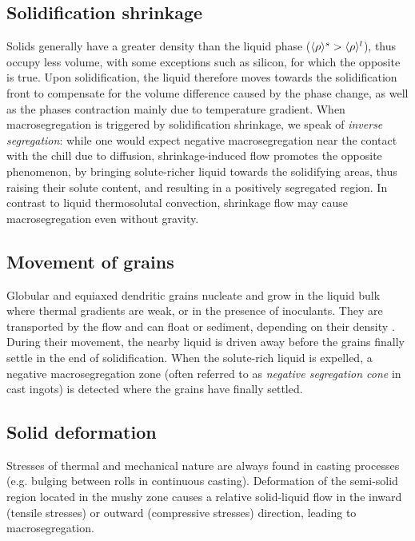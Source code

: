 \subsection{Solidification shrinkage}

Solids generally have a greater density than the liquid phase ($\langle \rho \rangle^s > \langle \rho \rangle^l$), 
thus occupy less volume, with some exceptions such as silicon, for which the opposite is true. 
Upon solidification, the liquid therefore moves towards the solidification front to compensate for the volume 
difference caused by the phase change, as well as the phases contraction mainly due to temperature gradient. When macrosegregation is 
triggered by solidification shrinkage, we speak of \emph{inverse segregation}: while one would expect 
negative macrosegregation near the contact with the chill due to diffusion, shrinkage-induced flow 
promotes the opposite phenomenon, by bringing solute-richer liquid towards the solidifying areas, thus raising 
their solute content, and resulting in a positively segregated region.
In contrast to liquid thermosolutal convection, shrinkage flow may cause macrosegregation even without gravity.
%
%

\subsection{Movement of grains}

Globular and equiaxed dendritic grains nucleate and grow in the liquid bulk where thermal gradients 
are weak, or in the presence of inoculants. They are transported by the flow and can float 
or sediment, depending on their density \citep{beckermann_modelling_2002}. During their movement, the nearby 
liquid is driven away before the grains finally settle in the end of solidification. When the solute-rich liquid
is expelled, a negative macrosegregation zone (often referred to as \emph{negative segregation cone} in cast ingots) 
is detected where the grains have finally settled.
%
%

\subsection{Solid deformation} 

Stresses of thermal and mechanical nature are always found in casting processes 
(e.g. bulging between rolls in continuous casting). 
Deformation of the semi-solid region located in the mushy zone causes a relative solid-liquid 
flow in the inward (tensile stresses) or outward (compressive stresses) direction, leading to macrosegregation.
%

